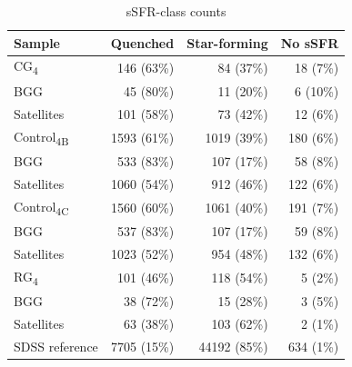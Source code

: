 \documentclass{aa}
\newcommand{\CB}{Control\textsubscript{4B}}
\newcommand{\CC}{Control\textsubscript{4C}}
\newcommand{\CG}{CG\textsubscript{4}}
\newcommand{\RG}{RG\textsubscript{4}}
\begin{document}
\begin{table}
    \centering
    \caption{sSFR-class counts}
    \label{tab:sSFR_status}
    \begin{tabular}{lrrr}
        \hline\hline
            Sample & \multicolumn{1}{c}{Quenched} & \multicolumn{1}{c}{Star-forming} & \multicolumn{1}{c}{No sSFR} \\
            \hline






            \addlinespace[2pt]
            \CG & 146 (63\%) & 84 (37\%) & 18 (7\%) \\
             \quad BGG & 45 (80\%) & 11 (20\%) & 6 (10\%) \\
             \quad Satellites & 101 (58\%) & 73 (42\%) & 12 (6\%) \\






            \addlinespace[2pt]
            \CB & 1593 (61\%) & 1019 (39\%) & 180 (6\%) \\
             \quad BGG & 533 (83\%) & 107 (17\%) & 58 (8\%) \\
             \quad Satellites & 1060 (54\%) & 912 (46\%) & 122 (6\%) \\






            \addlinespace[2pt]
            \CC & 1560 (60\%) & 1061 (40\%) & 191 (7\%) \\
             \quad BGG & 537 (83\%) & 107 (17\%) & 59 (8\%) \\
             \quad Satellites & 1023 (52\%) & 954 (48\%) & 132 (6\%) \\






            \addlinespace[2pt]
            \RG & 101 (46\%) & 118 (54\%) & 5 (2\%) \\
             \quad BGG & 38 (72\%) & 15 (28\%) & 3 (5\%) \\
             \quad Satellites & 63 (38\%) & 103 (62\%) & 2 (1\%) \\

         \hline
            SDSS reference & 7705 (15\%) & 44192 (85\%) & 634 (1\%) \\
        \hline
    \end{tabular}
\end{table}
\end{document}
